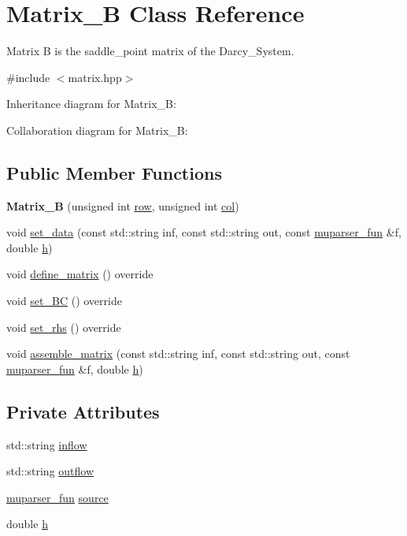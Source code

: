 \hypertarget{classMatrix__B}{}\section{Matrix\+\_\+B Class Reference}
\label{classMatrix__B}


Matrix B is the saddle\+\_\+point matrix of the Darcy\+\_\+\+System.  




{\ttfamily \#include $<$matrix.\+hpp$>$}



Inheritance diagram for Matrix\+\_\+B\+:


Collaboration diagram for Matrix\+\_\+B\+:
\subsection*{Public Member Functions}
\begin{DoxyCompactItemize}
\item 
\mbox{\label{classMatrix__B_a581fdeb9726adc58a29d84ee00a5803f}} 
{\bfseries Matrix\+\_\+B} (unsigned int \hyperlink{classAbstractMatrix_a27fb46bf2853d4927d92a81b8b7773fb}{row}, unsigned int \hyperlink{classAbstractMatrix_af3ad3551ce094979488cef5df0e4fc1d}{col})
\item 
void \hyperlink{classMatrix__B_a65bf84cdaf6687394a6bd6e4a5558868}{set\+\_\+data} (const std\+::string inf, const std\+::string out, const \hyperlink{classmuparser__fun}{muparser\+\_\+fun} \&f, double \hyperlink{classMatrix__B_ad45ceefd12c2c4221943b5e92bafcee5}{h})
\item 
void \hyperlink{classMatrix__B_a996a421d226769d39583f228d0ce0f00}{define\+\_\+matrix} () override
\item 
void \hyperlink{classMatrix__B_a1a076a3ccac19b0ad436686bc8b8babd}{set\+\_\+\+BC} () override
\item 
void \hyperlink{classMatrix__B_ab4f89f8522128bd9677fd301f4f96c6e}{set\+\_\+rhs} () override
\item 
void \hyperlink{classMatrix__B_a4f6fc5aef429ca2b80901e280ab5a593}{assemble\+\_\+matrix} (const std\+::string inf, const std\+::string out, const \hyperlink{classmuparser__fun}{muparser\+\_\+fun} \&f, double \hyperlink{classMatrix__B_ad45ceefd12c2c4221943b5e92bafcee5}{h})
\end{DoxyCompactItemize}
\subsection*{Private Attributes}
\begin{DoxyCompactItemize}
\item 
std\+::string \hyperlink{classMatrix__B_aa09ba2dc48bc7ad46d5e0e7bb70d43da}{inflow}
\item 
std\+::string \hyperlink{classMatrix__B_a447ea580c1b63f7e3984cedbb217c61c}{outflow}
\item 
\hyperlink{classmuparser__fun}{muparser\+\_\+fun} \hyperlink{classMatrix__B_ad2925cbb0e6aed0a6795e85af422a62f}{source}
\item 
double \hyperlink{classMatrix__B_ad45ceefd12c2c4221943b5e92bafcee5}{h}
\end{DoxyCompactItemize}
